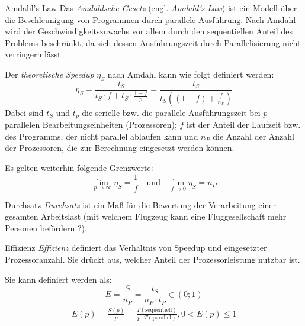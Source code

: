 \begin{defi}{Amdahl's Law}
    Das \emph{Amdahlsche Gesetz} (engl. \emph{Amdahl's Law}) ist ein Modell über die Beschleunigung von Programmen durch parallele Ausführung.
    Nach Amdahl wird der Geschwindigkeitszuwachs vor allem durch den sequentiellen Anteil des Problems beschränkt, da sich dessen Ausführungszeit durch Parallelisierung nicht verringern lässt.

    Der \emph{theoretische Speedup} $\eta_S$ nach Amdahl kann wie folgt definiert werden:
    \[
        \eta_S = \frac{t_S}{t_S \cdot f + t_S \cdot \frac{1-f}{p} } = \frac{t_S}{t_S \left((1 - f) + \frac{f}{n_P}\right)}
    \]
    Dabei sind $t_S$ und $t_p$ die serielle bzw. die parallele Ausführungszeit bei $p$ parallelen Bearbeitungseinheiten (Prozessoren);
    $f$ ist der Anteil der Laufzeit bzw. des Programms, der nicht parallel ablaufen kann und $n_P$ die Anzahl der Anzahl der Prozessoren, die zur Berechnung eingesetzt werden können.

    Es gelten weiterhin folgende Grenzwerte:
    \[
        \lim_{p \to \infty} \eta_S = \frac{1}{f} \quad \text{und} \quad \lim_{f \to 0 } \eta_S = n_P
    \]
\end{defi}

\begin{bonus}{Durchsatz}
    \emph{Durchsatz} ist ein Maß für die Bewertung der Verarbeitung einer gesamten Arbeitslast
    (mit welchem Flugzeug kann eine Fluggesellschaft mehr Personen befördern ?).
\end{bonus}

\begin{defi}{Effizienz}
    \emph{Effizienz} definiert das Verhältnis von Speedup und eingesetzter Prozessoranzahl.
    Sie drückt aus, welcher Anteil der Prozessorleistung nutzbar ist.

    Sie kann definiert werden als:
    \[
        E = \frac{S}{n_P} = \frac{t_S}{n_P\cdot t_P} \in (0; 1)
    \]
    \begin{align*}
        E(p) = \frac{S(p)}{p} =
        \frac{T(\text{sequentiell})}{p\cdot T(\text{parallel})},
        0<E(p)\leq 1
    \end{align*}
\end{defi}

